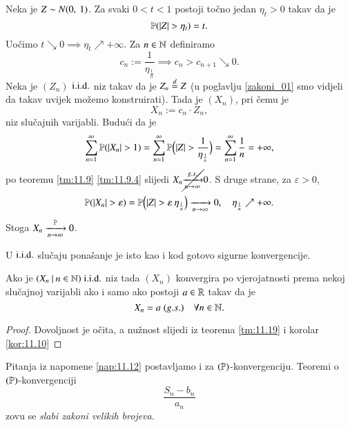 \begin{pr}  \label{pr:11.23}
    Neka je $Z \sim N ({0}, \: {1})$. Za svaki $0<t<1$ postoji to\v cno jedan $\eta_t > 0$ takav da je
    \begin{equation*}
        \mathbb{P}({|Z| > \eta_t}) = t.
    \end{equation*}
    Uo\v cimo $t \searrow 0 \implies \eta_t \nearrow +\infty$.
    Za $n \in \mathbb{N}$ definiramo
    \begin{equation*}
        c_n := \frac{1}{\eta_\frac{1}{n}}\implies c_n > c_{n + 1} \searrow 0.
    \end{equation*}
    Neka je $(Z_n)$ $\mathrm{i.i.d.}$ niz takav da je $Z_n \overset{d}{=} Z$ (u poglavlju \ref{zakoni_01} smo vidjeli da takav uvijek mo\v zemo konstruirati).
    Tada je $(X_n)$, pri \v cemu je
    \begin{equation*}
        X_n := c_n \cdot Z_n,
    \end{equation*}
    niz slu\v cajnih varijabli.
    Budu\' ci da je
    \begin{equation*}
        \sum\limits_{n = 1}^{\infty} \mathbb{P}({|X_n| > 1}) = \sum\limits_{n = 1}^{\infty} \mathbb{P} \Big( |Z| > \frac{1}{\eta_\frac{1}{n}} \Big) = \sum\limits_{n = 1}^{\infty} \frac{1}{n} = +\infty,
    \end{equation*}
    po teoremu \ref{tm:11.9} \ref{tm:11.9.4} slijedi $X_n \cancel{\xrightarrow[n \to \infty]{g.s.}} 0$.
    S druge strane, za $\varepsilon > 0$,
    \begin{equation*}
        \mathbb{P}({|X_n| > \varepsilon}) = \mathbb{P} \Big( |Z| > \varepsilon \: \eta_\frac{1}{n} \Big) \xrightarrow[n \to \infty]{} 0, \quad \eta_\frac{1}{n} \nearrow +\infty.
    \end{equation*}
    Stoga $X_n \xrightarrow[n \to \infty]{\mathbb{P}} 0$.
\end{pr}

U $\mathrm{i.i.d.}$ slu\v caju pona\v sanje je isto kao i kod gotovo sigurne konvergencije.

\begin{kor} \label{kor:11.24}
    Ako je $({X_n} \: | \: {n \in \mathbb{N}}) \; \mathrm{i.i.d.}$ niz tada $(X_n)$ konvergira po vjerojatnosti prema nekoj slu\v cajnoj varijabli ako i samo ako postoji $a \in \mathbb{R}$ takav da je
    \begin{equation*}
        X_n = a \; (g.s.) \quad \forall n \in \mathbb{N}.
    \end{equation*}
\end{kor}

\begin{proof}
    Dovoljnost je o\v cita, a nu\v znost slijedi iz teorema \ref{tm:11.19} i korolar \ref{kor:11.10}
\end{proof}

Pitanja iz napomene \ref{nap:11.12} postavljamo i za $(\mathbb{P})$-konvergenciju.
Teoremi o $(\mathbb{P})$-konvergenciji
\begin{equation*}
    \frac{S_n - b_n}{a_n}
\end{equation*}
zovu se \emph{slabi zakoni velikih brojeva}.